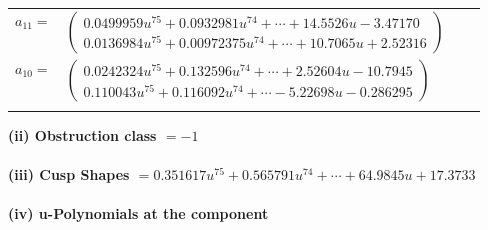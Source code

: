 \documentclass[1p]{elsarticle_modified}
\theoremstyle{definition}
\begin{document}
\begin{tabular}{m{7pt} m{180pt} m{7pt} m{180pt} }
\flushright $a_{11}=$&$\begin{pmatrix}0.0499959 u^{75}+0.0932981 u^{74}+\cdots+14.5526 u-3.47170\\0.0136984 u^{75}+0.00972375 u^{74}+\cdots+10.7065 u+2.52316\end{pmatrix}$ \\
\flushright $a_{10}=$&$\begin{pmatrix}0.0242324 u^{75}+0.132596 u^{74}+\cdots+2.52604 u-10.7945\\0.110043 u^{75}+0.116092 u^{74}+\cdots-5.22698 u-0.286295\end{pmatrix}$\\&\end{tabular}
\flushleft \textbf{(ii) Obstruction class $= -1$}\\~\\
\flushleft \textbf{(iii) Cusp Shapes $= 0.351617 u^{75}+0.565791 u^{74}+\cdots+64.9845 u+17.3733$}\\~\\
\newpage\renewcommand{\arraystretch}{1}
\flushleft \textbf{(iv) u-Polynomials at the component}\newline \\
\end{document}
